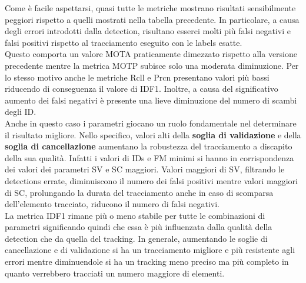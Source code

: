 Come è facile aspettarsi, quasi tutte le metriche mostrano risultati sensibilmente peggiori rispetto a quelli mostrati nella tabella precedente. In particolare, a causa degli errori introdotti dalla detection, risultano esserci molti più falsi negativi e falsi positivi rispetto al tracciamento eseguito con le labels esatte.\\ Questo comporta un valore MOTA praticamente dimezzato rispetto alla versione precedente mentre la metrica MOTP subisce solo una moderata diminuzione. Per lo stesso motivo anche le metriche Rcll e Prcn presentano valori più bassi riducendo di conseguenza il valore di IDF1. Inoltre, a causa del significativo aumento dei falsi negativi è presente una lieve diminuzione del numero di scambi degli ID.\\
Anche in questo caso i parametri giocano un ruolo fondamentale nel determinare il risultato migliore. Nello specifico, valori alti della \textbf{soglia di validazione} e della \textbf{soglia di cancellazione} aumentano la robustezza del tracciamento a discapito della sua qualità. Infatti i valori di IDs e FM minimi si hanno in corrispondenza dei valori dei parametri SV e SC maggiori. Valori maggiori di SV, filtrando le detections errate, diminuiscono il numero dei falsi positivi mentre valori maggiori di SC, prolungando la durata del tracciamento anche in caso di scomparsa dell'elemento tracciato, riducono il numero di falsi negativi.\\ 
La metrica IDF1 rimane più o meno stabile per tutte le combinazioni di parametri significando quindi che essa è più influenzata dalla qualità della detection che da quella del tracking. In generale, aumentando le soglie di cancellazione e di validazione si ha un tracciamento migliore e più resistente agli errori mentre diminuendole si ha un tracking meno preciso ma più completo in quanto verrebbero tracciati un numero maggiore di elementi.